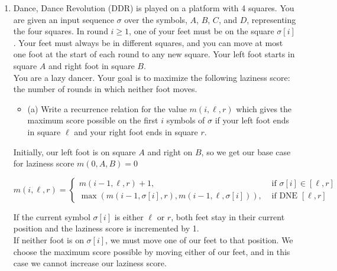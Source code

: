 \documentclass{article}
\begin{document}
\begin{enumerate}
\newpage 
\item Dance, Dance Revolution (DDR) is played on a platform with 4 squares. You are given an input sequence $\sigma$ over the symbols, $A$, $B$, $C$, and $D$, representing the four squares. In round $i \geq 1$, one of your feet must be on the square $\sigma[i]$. Your feet must always be in different squares, and you can move at most one foot at the start of each round to any new square. Your left foot starts in square $A$ and right foot in square $B$. \\
You are a lazy dancer. Your goal is to maximize the following laziness score: the number of rounds in which neither foot moves.
\begin{itemize}
    \item (a) Write a recurrence relation for the value $m(i, \ell, r)$ which gives the maximum score possible on the first $i$ symbols of $\sigma$ if your left foot ends in square $\ell$ and your right foot ends in square $r$.
\end{itemize}

Initially, our left foot is on square $A$ and right on $B$, so we get our base case for laziness score $m(0,A,B) = 0$

\[
m(i, \ell, r) = \left\{
\begin{array}{ll}
m(i-1, \ell, r) + 1, & \text{ if } \sigma[i] \in [\ell, r] \\
\max (m(i-1, \sigma[i], r), m(i-1, \ell, \sigma[i])), & \text{ if DNE } [\ell, r] 
\end{array}
\right.
\]

If the current symbol $\sigma[i]$ is either $\ell$ or $r$, both feet stay in their current position and the laziness score is incremented by 1. \\
If neither foot is on $\sigma[i]$, we must move one of our feet to that position. We choose the maximum score possible by moving either of our feet, and in this case we cannot increase our laziness score. \\
\newline 







\end{enumerate}
\end{document}
